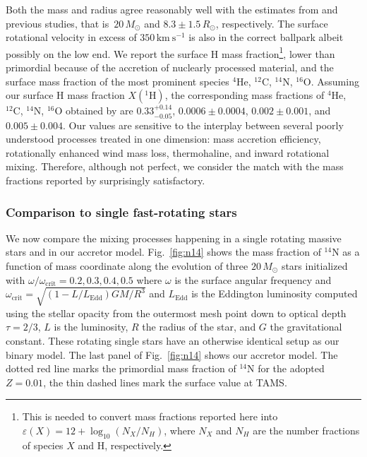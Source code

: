 \documentclass[twocolumn,twocolappendix,trackchanges]{aastex63}
\newcommand{\kms}{{\mathrm{km\ s^{-1}}}}
\DeclareRobustCommand{\Figref}[1]{Fig.~\ref{#1}}
\DeclareRobustCommand{\Secref}[1]{Sec.~\ref{#1}}
\begin{document}
Both the mass and radius agree reasonably well with the estimates from
 and previous studies, that is~$20\,M_\odot$ and
$8.3\pm1.5\,R_\odot$, respectively. The surface rotational velocity in
excess of $350\,\kms$ is also in the correct ballpark albeit possibly
on the low end. %
We report the surface H mass
fraction\footnote{This is needed to convert mass fractions reported
  here into $\varepsilon(X)=12+\log_{10}(N_X/N_H)$, where $N_X$ and
  $N_H$ are the number fractions of species $X$ and H, respectively.},
lower than primordial because of the accretion of nuclearly processed
material, and the surface mass fraction of the most prominent species
$^4\mathrm{He}$, $^{12}\mathrm{C}$, $^{14}\mathrm{N}$,
$^{16}\mathrm{O}$.  Assuming our surface H mass fraction
$X(^1\mathrm{H})$, the corresponding mass fractions of $^4\mathrm{He}$,
$^{12}\mathrm{C}$, $^{14}\mathrm{N}$, $^{16}\mathrm{O}$ obtained by
 are
$0.33^{+0.14}_{-0.05}$,
$0.0006\pm0.0004$,
$0.002\pm0.001$, and
$0.005\pm0.004$.  Our values are
sensitive to the interplay between several poorly understood
processes treated in one dimension: mass accretion efficiency, rotationally enhanced wind mass
loss, thermohaline, and inward rotational mixing. Therefore, although
not perfect, we consider the match with the mass fractions reported by
 surprisingly satisfactory.

\subsubsection{Comparison to single fast-rotating stars}


We now compare the mixing processes
happening in a single rotating massive stars and in our accretor
model. \Figref{fig:n14} shows the mass fraction of $^{14}\mathrm{N}$
as a function of mass coordinate along the evolution of three
$20\,M_\odot$ stars initialized with
$\omega/\omega_\mathrm{crit}=0.2,0.3,0.4,0.5$ where $\omega$ is the
surface angular frequency and
$\omega_\mathrm{crit}=\sqrt{(1-L/L_\mathrm{Edd})GM/R^3}$ and
$L_\mathrm{Edd}$ is the Eddington luminosity computed using the
stellar opacity from the outermost mesh point down to optical depth
$\tau=2/3$, $L$ is the luminosity, $R$ the radius of the star, and $G$
the gravitational constant. These rotating single stars have an otherwise identical
setup as our binary model. The last panel of \Figref{fig:n14} shows
our accretor model. The dotted red line marks the primordial mass
fraction of $^{14}\mathrm{N}$ for the adopted $Z=0.01$, the thin
dashed lines mark the surface value at TAMS.
\end{document}
